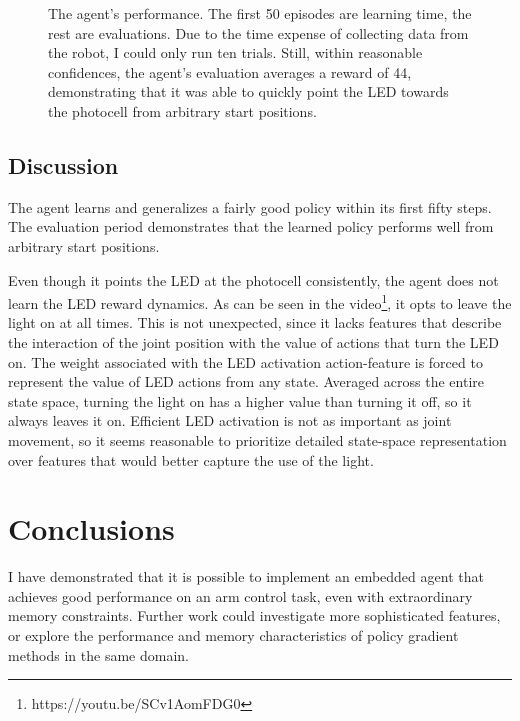 \documentclass{article}
\begin{document}
	\begin{figure}[h]
		\begin{center}
			\caption{The agent's performance. The first 50 episodes are learning time, the rest are evaluations. Due to the time expense of collecting data from the robot, I could only run ten trials. Still, within reasonable confidences, the agent's evaluation averages a reward of 44, demonstrating that it was able to quickly point the LED towards the photocell from arbitrary start positions.}
		\end{center}
	\end{figure}
	
\subsection{Discussion}

The agent learns and generalizes a fairly good policy within its first fifty steps. The evaluation period demonstrates that the learned policy performs well from arbitrary start positions. 

Even though it points the LED at the photocell consistently, the agent does not learn the LED reward dynamics. As can be seen in the video\footnote{https://youtu.be/SCv1AomFDG0}, it opts to leave the light on at all times. This is not unexpected, since it lacks features that describe the interaction of the joint position with the value of actions that turn the LED on. The weight associated with the LED activation action-feature is forced to represent the value of LED actions from any state. Averaged across the entire state space, turning the light on has a higher value than turning it off, so it always leaves it on. Efficient LED activation is not as important as joint movement, so it seems reasonable to prioritize detailed state-space representation over features that would better capture the use of the light.



\section{Conclusions}

I have demonstrated that it is possible to implement an embedded agent that achieves good performance on an arm control task, even with extraordinary memory constraints. Further work could investigate more sophisticated features, or explore the performance and memory characteristics of policy gradient methods in the same domain.
\end{document}
